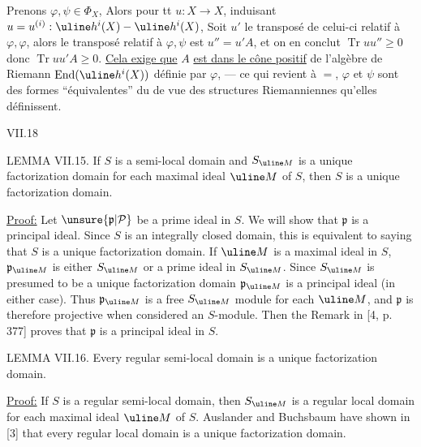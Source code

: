 
Prenons $\varphi,\psi\in\Phi_X$,
Alors pour tt $u:X\longrightarrow X$, induisant
$u=u^{(i)}:\uline h^i(X)\mathbin{-}\uline h^i(X)$,
Soit $u'$ le transposé de celui-ci relatif à $\varphi,\varphi$,
alors le transposé relatif à $\varphi,\psi$ est $u''=u'A$,
et on en conclut $\operatorname{Tr}uu''\geq0$ donc $\operatorname{Tr}uu'A\geq0$.
\uline{Cela exige que} $A$ \uline{est dans le cône positif}
de l'algèbre  de Riemann
$\operatorname{End}(\uline h^i(X))$ définie par $\varphi$, --- ce qui
revient à $=$, $\varphi$ et $\psi$ sont des formes
``équivalentes'' du  de vue des structures
Riemanniennes qu'elles définissent.

VII.18

LEMMA VII.15. If $S$ is a semi-local domain and $S_{\uline M}$ is
a unique factorization domain for each maximal ideal $\uline M$ of $S$,
then $S$ is a unique factorization domain.

\uline{Proof:} Let $\unsure{\mathfrak p|\mathcal P}$ be a prime ideal in $S$. We will show that $\mathfrak p$ is
a principal ideal. Since $S$ is an integrally closed domain, this is
equivalent to saying that $S$ is a unique factorization domain. If $\uline M$
is a maximal ideal in $S$, $\mathfrak p_{\uline M}$ is either $S_{\uline M}$ or a prime ideal in $S_{\uline M}$.
Since $S_{\uline M}$ is presumed to be a unique factorization domain $\mathfrak p_{\uline M}$ is
a principal ideal (in either case). Thus $\mathfrak p_{\uline M}$ is a free $S_{\uline M}$ module
for each $\uline M$, and $\mathfrak p$ is therefore projective when considered an
$S$-module. Then the Remark in [4, p. 377] proves that $\mathfrak p$ is a
principal ideal in $S$.

LEMMA VII.16. Every regular semi-local domain is a unique
factorization domain.

\uline{Proof:} If $S$ is a regular semi-local domain, then $S_{\uline M}$ is a
regular local domain for each maximal ideal $\uline M$ of $S$. Auslander
and Buchsbaum have shown in [3] that every regular local domain is a
unique factorization domain.

